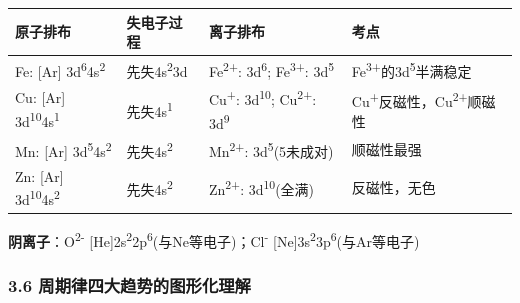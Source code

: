 {\def\LTcaptype{none} %
\begin{longtable}[]{@{}
  >{\raggedright\arraybackslash}p{}
  >{\raggedright\arraybackslash}p{}
  >{\raggedright\arraybackslash}p{}
  >{\raggedright\arraybackslash}p{}@{}}
\toprule\noalign{}
\begin{minipage}[b]{\linewidth}\raggedright
原子排布
\end{minipage} & \begin{minipage}[b]{\linewidth}\raggedright
失电子过程
\end{minipage} & \begin{minipage}[b]{\linewidth}\raggedright
离子排布
\end{minipage} & \begin{minipage}[b]{\linewidth}\raggedright
考点
\end{minipage} \\
\midrule\noalign{}
\endhead
\bottomrule\noalign{}
\endlastfoot
Fe: {[}Ar{]} 3d\textsuperscript{6}4s\textsuperscript{2} & 先失4s\textsuperscript{2}3d & Fe\textsuperscript{2+}: 3d\textsuperscript{6}; Fe\textsuperscript{3+}: 3d\textsuperscript{5} & Fe\textsuperscript{3+}的3d\textsuperscript{5}半满稳定 \\
Cu: {[}Ar{]} 3d\textsuperscript{10}4s\textsuperscript{1} & 先失4s\textsuperscript{1} & Cu\textsuperscript{+}: 3d\textsuperscript{10}; Cu\textsuperscript{2+}: 3d\textsuperscript{9} & Cu\textsuperscript{+}反磁性，Cu\textsuperscript{2+}顺磁性 \\
Mn: {[}Ar{]} 3d\textsuperscript{5}4s\textsuperscript{2} & 先失4s\textsuperscript{2} & Mn\textsuperscript{2+}: 3d\textsuperscript{5}(5未成对) & 顺磁性最强 \\
Zn: {[}Ar{]} 3d\textsuperscript{10}4s\textsuperscript{2} & 先失4s\textsuperscript{2} & Zn\textsuperscript{2+}: 3d\textsuperscript{10}(全满) & 反磁性，无色 \\
\end{longtable}
}

\textbf{阴离子}：O\textsuperscript{2-} {[}He{]}2s\textsuperscript{2}2p\textsuperscript{6}(与Ne等电子)；Cl\textsuperscript{-} {[}Ne{]}3s\textsuperscript{2}3p\textsuperscript{6}(与Ar等电子)

\subsubsection{3.6 周期律四大趋势的图形化理解}\label{ux5468ux671fux5f8bux56dbux5927ux8d8bux52bfux7684ux56feux5f62ux5316ux7406ux89e3}

